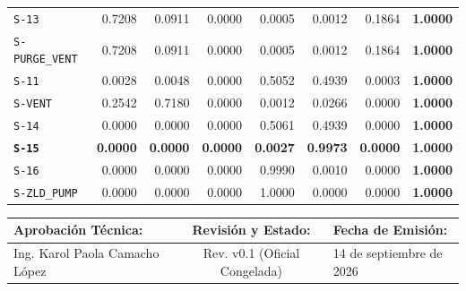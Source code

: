 \documentclass[11pt,letterpaper]{article}
\begin{document}
\begin{center}
\begin{tabularx}{\textwidth}{lrrrrrrc}
\texttt{S-13} & 0.7208 & 0.0911 & 0.0000 & 0.0005 & 0.0012 & 0.1864 & \textbf{1.0000} \\
\texttt{S-PURGE\_VENT}& 0.7208 & 0.0911 & 0.0000 & 0.0005 & 0.0012 & 0.1864 & \textbf{1.0000} \\
\texttt{S-11} & 0.0028 & 0.0048 & 0.0000 & 0.5052 & 0.4939 & 0.0003 & \textbf{1.0000} \\
\texttt{S-VENT} & 0.2542 & 0.7180 & 0.0000 & 0.0012 & 0.0266 & 0.0000 & \textbf{1.0000} \\
\texttt{S-14} & 0.0000 & 0.0000 & 0.0000 & 0.5061 & 0.4939 & 0.0000 & \textbf{1.0000} \\
\textbf{\texttt{S-15}} & \textbf{0.0000} & \textbf{0.0000} & \textbf{0.0000} & \textbf{0.0027} & \textbf{0.9973} & \textbf{0.0000} & \textbf{1.0000} \\
\texttt{S-16} & 0.0000 & 0.0000 & 0.0000 & 0.9990 & 0.0010 & 0.0000 & \textbf{1.0000} \\
\texttt{S-ZLD\_PUMP} & 0.0000 & 0.0000 & 0.0000 & 1.0000 & 0.0000 & 0.0000 & \textbf{1.0000} \\
\bottomrule
\end{tabularx}
\end{center}

\vspace{0.8cm}
\begin{center}
\footnotesize
\begin{tabularx}{0.95\textwidth}{XcX}
\toprule
\textbf{Aprobación Técnica:} & \textbf{Revisión y Estado:} & \textbf{Fecha de Emisión:} \\
\midrule
Ing. Karol Paola Camacho López & Rev. v0.1 (Oficial Congelada) & 14 de septiembre de 2026 \\
\bottomrule
\end{tabularx}
\end{center}
\end{document}
